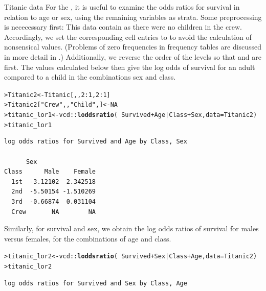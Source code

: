 \documentclass[10pt,krantz2]{krantz}\usepackage[]{graphicx}\usepackage[]{color}
\makeatletter
\newcommand{\hlnum}[1]{\textcolor[rgb]{0.686,0.059,0.569}{#1}}%
\newcommand{\hlstr}[1]{\textcolor[rgb]{0.192,0.494,0.8}{#1}}%
\newcommand{\hlopt}[1]{\textcolor[rgb]{0,0,0}{#1}}%
\newcommand{\hlstd}[1]{\textcolor[rgb]{0.345,0.345,0.345}{#1}}%
\newcommand{\hlkwb}[1]{\textcolor[rgb]{0.69,0.353,0.396}{#1}}%
\newcommand{\hlkwc}[1]{\textcolor[rgb]{0.333,0.667,0.333}{#1}}%
\newcommand{\hlkwd}[1]{\textcolor[rgb]{0.737,0.353,0.396}{\textbf{#1}}}%
\newenvironment{kframe}{%
 \def\at@end@of@kframe{}%
 \ifinner\ifhmode%
  \def\at@end@of@kframe{\end{minipage}}%
  \begin{minipage}{\columnwidth}%
 \fi\fi%
 \def\FrameCommand##1{\hskip\@totalleftmargin \hskip-\fboxsep
 \colorbox{shadecolor}{##1}\hskip-\fboxsep
     \hskip-\linewidth \hskip-\@totalleftmargin \hskip\columnwidth}%
 \MakeFramed {\advance\hsize-\width
   \@totalleftmargin\z@ \linewidth\hsize
   \@setminipage}}%
 {\par\unskip\endMakeFramed%
 \at@end@of@kframe}
\newenvironment{knitrout}{}{} %
\renewenvironment{knitrout}{\small\renewcommand{\baselinestretch}{.85}}{} %
\makeatother
\begin{document}
\begin{Example}{Titanic data}
For the , it is useful to examine the odds ratios for
survival in relation to age or sex, using the remaining variables as strata. 
Some preprocessing is nececessary first: This data contain
 as there were no children in the
crew. Accordingly, we set the corresponding cell entries to 
to avoid the calculation of nonsensical values. (Problems of zero
frequencies in frequency tables are discussed in more detail in .)
Additionally, we reverse the order of the levels so that  and
 are first.  The values calculated below then give the log odds of survival for an
adult compared to a child in the combinations sex and class.
\begin{knitrout}
\color{fgcolor}\begin{kframe}
\begin{alltt}
\hlstd{> }\hlstd{Titanic2} \hlkwb{<-} \hlstd{Titanic[,,}\hlnum{2}\hlopt{:}\hlnum{1}\hlstd{,}\hlnum{2}\hlopt{:}\hlnum{1}\hlstd{]}
\hlstd{> }\hlstd{Titanic2[}\hlstr{"Crew"}\hlstd{,,}\hlstr{"Child"}\hlstd{,]} \hlkwb{<-} \hlnum{NA}
\hlstd{> }\hlstd{titanic_lor1} \hlkwb{<-} \hlstd{vcd}\hlopt{::}\hlkwd{loddsratio}\hlstd{(}\hlopt{~} \hlstd{Survived} \hlopt{+} \hlstd{Age} \hlopt{|} \hlstd{Class} \hlopt{+} \hlstd{Sex,} \hlkwc{data} \hlstd{= Titanic2)}
\hlstd{> }\hlstd{titanic_lor1}
\end{alltt}
\begin{verbatim}
log odds ratios for Survived and Age by Class, Sex 

      Sex
Class      Male    Female
  1st  -3.12102  2.342518
  2nd  -5.50154 -1.510269
  3rd  -0.66874  0.031104
  Crew       NA        NA
\end{verbatim}
\end{kframe}
\end{knitrout}
Similarly, for survival and sex, we obtain the log odds ratios of
survival for males versus females, for the combinations of age and class.%
\begin{knitrout}
\color{fgcolor}\begin{kframe}
\begin{alltt}
\hlstd{> }\hlstd{titanic_lor2} \hlkwb{<-} \hlstd{vcd}\hlopt{::}\hlkwd{loddsratio}\hlstd{(}\hlopt{~} \hlstd{Survived} \hlopt{+} \hlstd{Sex} \hlopt{|} \hlstd{Class} \hlopt{+} \hlstd{Age,} \hlkwc{data} \hlstd{= Titanic2)}
\hlstd{> }\hlstd{titanic_lor2}
\end{alltt}
\begin{verbatim}
log odds ratios for Survived and Sex by Class, Age 


\end{verbatim}
\end{kframe}
\end{knitrout}
\end{Example}
\end{document}
